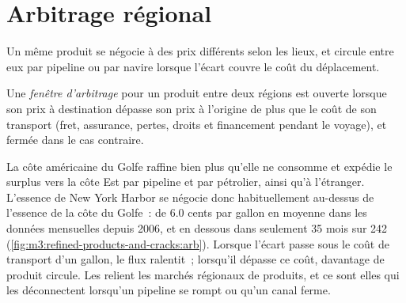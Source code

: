 \section{Arbitrage régional}

Un même produit se négocie à des prix différents selon les lieux, et circule
entre eux par pipeline ou par navire lorsque l'écart couvre le coût du déplacement.

\begin{definition}\label{def:m3:refined-products-and-cracks:arb}
Une \emph{fenêtre d'arbitrage} pour un produit entre deux régions
est ouverte lorsque son prix à destination dépasse son prix à l'origine de plus
que le coût de son transport (fret, assurance, pertes, droits et financement pendant le
voyage), et fermée dans le cas contraire.
\end{definition}

La côte américaine du Golfe raffine bien plus qu'elle ne consomme et expédie le surplus vers la
côte Est par pipeline et par pétrolier, ainsi qu'à l'étranger. L'essence de New York Harbor se négocie donc
habituellement au-dessus de l'essence de la côte du Golfe~: de 6.0 cents par gallon en moyenne dans les
données mensuelles depuis 2006, et en dessous dans seulement 35 mois sur 242
(\cref{fig:m3:refined-products-and-cracks:arb}). Lorsque l'écart passe sous le
coût de transport d'un gallon, le flux ralentit~; lorsqu'il dépasse ce coût, davantage de produit circule.
Les  relient les marchés régionaux de produits, et ce sont elles qui
les déconnectent lorsqu'un pipeline se rompt ou qu'un canal ferme.

\begin{omfigure}

\label{fig:m3:refined-products-and-cracks:arb}
\end{omfigure}

